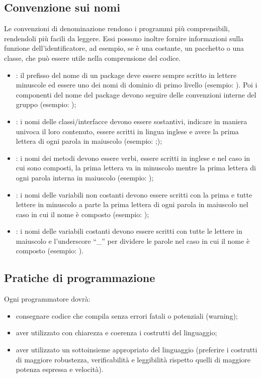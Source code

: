 \subsection{Convenzione sui nomi}
Le convenzioni di denominazione rendono i programmi pi\`u comprensibili,
rendendoli pi\`u facili da leggere. Essi possono inoltre fornire informazioni
sulla funzione dell'identificatore, ad esempio, se \`e una costante, un
pacchetto o una classe, che pu\`o essere utile nella comprensione del codice.
\begin{itemize}
  \item {}: il prefisso del nome di un package deve essere sempre
  scritto in lettere minuscole ed essere uno dei nomi di dominio di primo
  livello (esempio: ).
  Poi i componenti del nome del package devono seguire delle
  convenzioni interne del gruppo (esempio: );
  \item {}: i nomi delle classi/interfacce devono essere
  sostantivi, indicare in maniera univoca il loro contenuto, essere scritti in
  lingua inglese e avere la prima lettera di ogni parola in maiuscolo (esempio:
  ;);
  \item {}: i nomi dei metodi devono essere verbi, essere scritti in
  inglese e nel caso in cui sono composti, la prima lettera va in
  minuscolo mentre la prima lettera di ogni parola interna in maiuscolo
  (esempio: );
  \item {}: i nomi delle variabili non costanti devono essere
  scritti con la prima e tutte lettere in minuscolo a parte la prima lettera di
  ogni parola in maiuscolo nel caso in cui il nome \`e composto (esempio:
  );
  \item {}: i nomi delle variabili costanti devono essere
  scritti con tutte le lettere in maiuscolo e l'underscore ``\_'' per dividere
  le parole nel caso in cui il nome \`e composto (esempio:
  ).
\end{itemize}

\subsection{Pratiche di programmazione}
Ogni programmatore dovr\`a:
\begin{itemize}
  \item{consegnare codice che compila senza errori fatali o
potenziali (warning);} 
  \item{aver utilizzato con chiarezza e coerenza i costrutti del
linguaggio;}
  \item{aver utilizzato un sottoinsieme appropriato del linguaggio
(preferire i costrutti di maggiore robustezza, verificabilit\`a e leggibilit\`a
rispetto quelli di maggiore potenza espressa e velocit\`a).}
\end{itemize}


